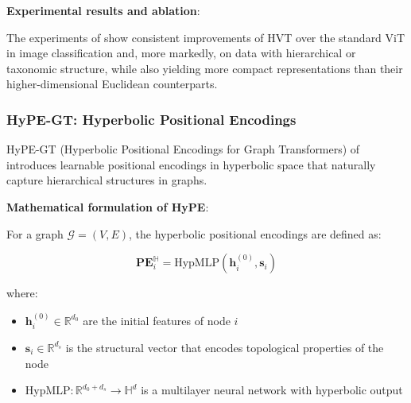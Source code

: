 \textbf{Experimental results and ablation}:

The experiments of \citet{hvt2024hyperbolic} show consistent improvements of HVT over the standard \gls{ViT} in image classification and, more markedly, on data with hierarchical or taxonomic structure, while also yielding more compact representations than their higher-dimensional Euclidean counterparts.

\subsubsection{HyPE-GT: Hyperbolic Positional Encodings}

HyPE-GT (Hyperbolic Positional Encodings for Graph Transformers) of \citet{hypegt2023} introduces learnable positional encodings in hyperbolic space that naturally capture hierarchical structures in graphs.

\textbf{Mathematical formulation of HyPE}:

\begin{definition}\label{def:hype_encoding}
For a graph $\mathcal{G} = (V, E)$, the hyperbolic positional encodings are defined as:

\begin{equation}
    \mathbf{PE}_i^{\mathbb{H}} = \text{HypMLP}(\mathbf{h}_i^{(0)}, \mathbf{s}_i)
    \label{eq:hyperbolic_positional_encoding}
\end{equation}

where:
\begin{itemize}
    \item $\mathbf{h}_i^{(0)} \in \mathbb{R}^{d_0}$ are the initial features of node $i$
    \item $\mathbf{s}_i \in \mathbb{R}^{d_s}$ is the structural vector that encodes topological properties of the node
    \item $\text{HypMLP}: \mathbb{R}^{d_0 + d_s} \to \mathbb{H}^d$ is a multilayer neural network with hyperbolic output
\end{itemize}
\end{definition}

